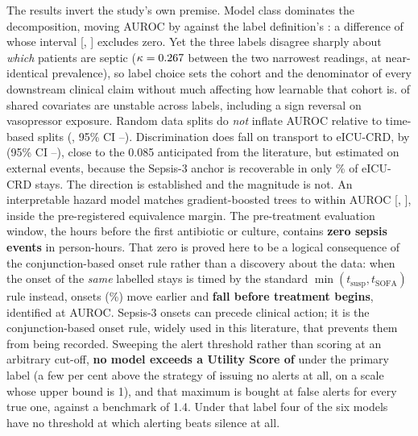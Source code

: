 The results invert the study's own premise. Model class dominates the
decomposition, moving AUROC by \pcSpreadModelClass{} against the label
definition's \pcSpreadLabel{}: a difference of \pcHOneEst{} whose interval
[\pcHOneCiLo, \pcHOneCiHi] excludes zero. Yet the three labels disagree sharply
about \emph{which} patients are septic ($\kappa = 0.267$ between the two
narrowest readings, at near-identical prevalence), so label choice sets the
cohort and the denominator of every downstream clinical claim without much
affecting how learnable that cohort is. \pcHTwoEst{} of \pcHTwoNTerms{} shared
covariates are unstable across labels, including a sign reversal on vasopressor
exposure. Random data splits do \emph{not} inflate AUROC relative to time-based
splits (\pcHFourEst, 95\% CI \pcHFourCiLo--\pcHFourCiHi). Discrimination does
fall on transport to eICU-CRD, by \pcHFiveEst{} (95\% CI
\pcHFiveCiLo--\pcHFiveCiHi), close to the 0.085 anticipated from the
literature, but estimated on \pcExtNEventsB{} external events, because the
Sepsis-3 anchor is recoverable in only \pcExtMicroCoverage\% of eICU-CRD stays.
The direction is established and the magnitude is not. An interpretable hazard
model matches
gradient-boosted trees to within \pcHSixEst{} AUROC
[\pcHSixCiLo, \pcHSixCiHi], inside the pre-registered equivalence margin. The
pre-treatment evaluation window, the hours before the first antibiotic or
culture, contains \textbf{zero sepsis events} in
\pcPreTreatPersonHoursVarB{} person-hours. That zero is proved here to be a
logical consequence of the conjunction-based onset rule rather than a discovery
about the data: when the onset of the \emph{same} labelled stays is timed by the
standard $\min(t_{\text{susp}}, t_{\text{SOFA}})$ rule instead,
\pcFNMovedEarlier{} onsets (\pcFPctMovedEarlier\%) move earlier and
\textbf{\pcPreTreatOnsetsVarF{} fall before treatment begins}, identified at
\pcPreTreatAurocPrimaryF{} AUROC. Sepsis-3 onsets can precede clinical action;
it is the conjunction-based onset rule, widely used in this literature, that
prevents them from being recorded. Sweeping the alert threshold rather than
scoring at an arbitrary cut-off, \textbf{no model exceeds a Utility Score of
\pcUtilityMaxGbtB{}} under the primary label (a few per cent above the
strategy of issuing no alerts at all, on a scale whose upper bound is 1), and
that maximum is bought at \pcUtilityOptBurdenGbtB{} false alerts for every true
one, against a benchmark of 1.4. Under that label four of the six models have
no threshold at which alerting beats silence at all.

